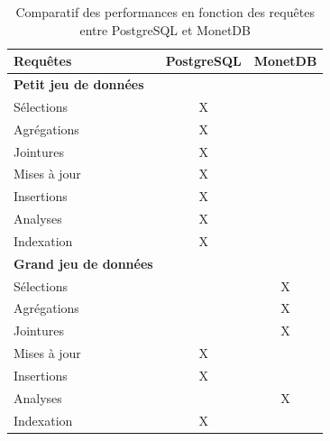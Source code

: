 \documentclass[11pt]{extarticle}
\begin{document}
\begin{table}[ht]
    \centering
    \setlength\arrayrulewidth{1pt}
    \def\arraystretch{0.82}
    \begin{tabular}{|l|c|c|}
    \hline
         \textbf{Requêtes} &  \textbf{PostgreSQL}
         & \textbf{MonetDB} \\ \hline
         \rowcolor[HTML]{343434} 
                    {\color[HTML]{FFFFFF} \textbf{Petit jeu de données}} &  & \\ \hline
                    Sélections & \cellcolor[HTML]{FCBF01}X &  \\ \hline
                    Agrégations & \cellcolor[HTML]{FCBF01}X &  \\ \hline
                    Jointures & \cellcolor[HTML]{FCBF01}X &  \\ \hline
                    Mises à jour & \cellcolor[HTML]{FCBF01}X &  \\ \hline
                    Insertions & \cellcolor[HTML]{FCBF01}X &  \\ \hline
                    Analyses & \cellcolor[HTML]{FCBF01}X &  \\ \hline
                    Indexation & \cellcolor[HTML]{FCBF01}X &  \\ \hline
                    \rowcolor[HTML]{343434} 
                    {\color[HTML]{FFFFFF} \textbf{Grand jeu de données}} &  & \\ \hline
                    Sélections &  & \cellcolor[HTML]{32C423}X  \\ \hline
                    Agrégations &  & \cellcolor[HTML]{32C423}X \\ \hline
                    Jointures &  & \cellcolor[HTML]{32C423}X \\ \hline
                    Mises à jour & \cellcolor[HTML]{FCBF01}X &  \\ \hline
                    Insertions & \cellcolor[HTML]{FCBF01}X &  \\ \hline
                    Analyses &  & \cellcolor[HTML]{32C423}X \\ \hline
                    Indexation & \cellcolor[HTML]{FCBF01}X &  \\ \hline
                    
                    
    \end{tabular}
    \caption{Comparatif des performances en fonction des requêtes entre PostgreSQL et MonetDB}
    \label{tab:my_label}
\end{table}
\end{document}
